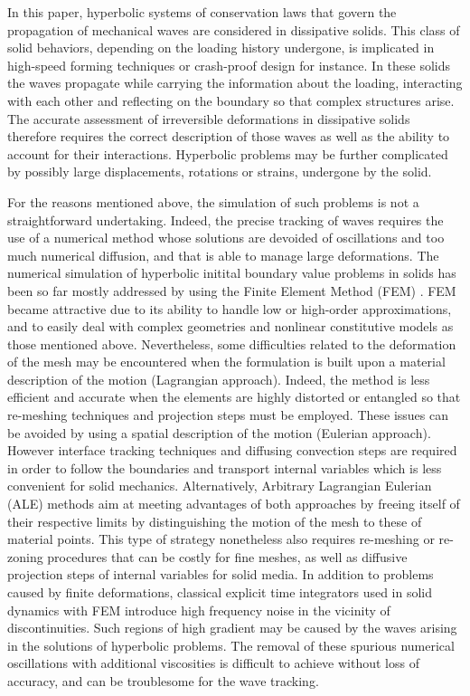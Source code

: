 In this paper, hyperbolic systems of conservation laws that govern the propagation of mechanical waves are considered in dissipative solids.
This class of solid behaviors, depending on the loading history undergone, is implicated in high-speed forming techniques or crash-proof design for instance.
In these solids the waves propagate while carrying the information about the loading, interacting with each other and reflecting on the boundary so that complex structures arise.
The accurate assessment of irreversible deformations in dissipative solids therefore requires the correct description of those waves as well as the ability to account for their interactions.
Hyperbolic problems may be further complicated by possibly large displacements, rotations or strains, undergone by the solid.

For the reasons mentioned above, the simulation of such problems is not a straightforward undertaking.
Indeed, the precise tracking of waves requires the use of a numerical method whose solutions are devoided of oscillations and too much numerical diffusion, and that is able to manage large deformations.
The numerical simulation of hyperbolic initital boundary value problems in solids has been so far mostly addressed by using the Finite Element Method (FEM) \cite{Belytschko}.
FEM became attractive due to its ability to handle low or high-order approximations, and to easily deal with complex geometries and nonlinear constitutive models as those mentioned above.
Nevertheless, some difficulties related to the deformation of the mesh may be encountered when the formulation is built upon a material description of the motion (Lagrangian approach). 
Indeed, the method is less efficient and accurate when the elements are highly distorted or entangled so that re-meshing techniques and projection steps must be employed.
These issues can be avoided by using a spatial description of the motion (Eulerian approach).
However interface tracking techniques and diffusing convection steps are required in order to follow the boundaries and transport internal variables which is less convenient for solid mechanics.
Alternatively, Arbitrary Lagrangian Eulerian (ALE) methods aim at meeting advantages of both approaches by freeing itself of their respective limits by distinguishing the motion of the mesh to these of material points.
This type of strategy nonetheless also requires re-meshing or re-zoning procedures that can be costly for fine meshes, as well as diffusive projection steps of internal variables for solid media.
In addition to problems caused by finite deformations, classical explicit time integrators used in solid dynamics with FEM introduce high frequency noise in the vicinity of discontinuities.
Such regions of high gradient may be caused by the waves arising in the solutions of hyperbolic problems.
The removal of these spurious numerical oscillations with additional viscosities is difficult to achieve without loss of accuracy, and can be troublesome for the wave tracking.

